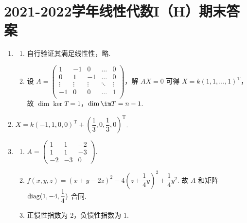\section{2021-2022学年线性代数I（H）期末答案}

\begin{enumerate}
    \item \begin{enumerate}
        \item 自行验证其满足线性性，略.
        \item 设 $A=\begin{pmatrix}
            1 & -1 & 0 & \ldots & 0 \\
            0 & 1 & -1 & \ldots & 0 \\
            \vdots & \vdots & \vdots & \ddots & \vdots \\
            -1 & 0 & 0 & \ldots & 1 \\
        \end{pmatrix}$，解 $AX=0$ 可得 $X = k(1,1,\ldots,1)^\mathrm{T}$，故 $\dim \ker T = 1$，$\dim \im T = n-1$.
    \end{enumerate}

    \item $X=k(-1,1,0,0)^\mathrm{T}+(\dfrac{1}{3},0,\dfrac{1}{3},0)^\mathrm{T}$.

    \item \begin{enumerate}
        \item $A=\begin{pmatrix}
            1 & 1 & -2 \\
            1 & 1 & -3 \\
            -2 & -3 & 0
        \end{pmatrix}$.
        \item $f(x,y,z)=(x+y-2z)^2-4(z+\dfrac{1}{4}y)^2+\dfrac{1}{4}y^2$. 故 $A$ 和矩阵 $\operatorname{diag}(1,-4,\dfrac{1}{4})$ 合同.
        \item 正惯性指数为 $2$，负惯性指数为 $1$.
    \end{enumerate}


\end{enumerate}
